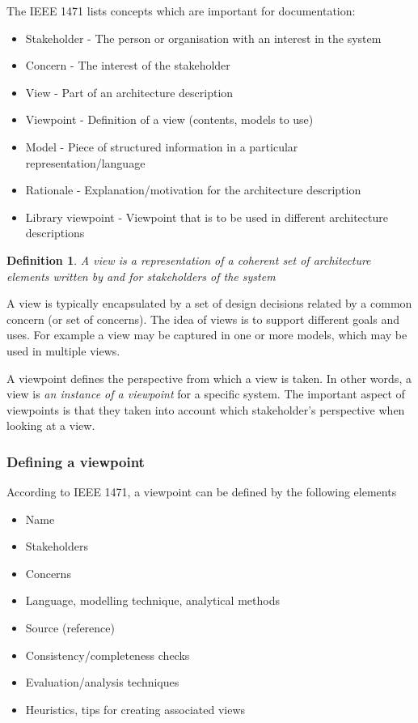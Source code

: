 \documentclass{sty/SizheArticle}
\newtheorem{definition}{Definition}
\begin{document}
The IEEE 1471 lists concepts which are important for documentation:
\begin{itemize}
\item Stakeholder - The person or organisation with an interest
  in the system
\item Concern - The interest of the stakeholder
\item View - Part of an architecture description
\item Viewpoint - Definition of a view (contents, models to use)
\item Model - Piece of structured information in a particular
  representation/language
\item Rationale - Explanation/motivation for the architecture description
\item Library viewpoint - Viewpoint that is to be used in
  different architecture descriptions
\end{itemize}

\begin{definition}
  A view is a representation of a coherent set of architecture
  elements written by and for stakeholders of the system
\end{definition}
A view is typically encapsulated by a set of design decisions
related by a common concern (or set of concerns). The idea of views
is to support different goals and uses. For example a view may be
captured in one or more models, which may be used in multiple views.

A viewpoint defines the perspective from which a view is taken.
In other words, a view is \textit{an instance of a viewpoint}
for a specific system. The important aspect of viewpoints is
that they taken into account which stakeholder's perspective when
looking at a view.
\subsubsection{Defining a viewpoint}
According to IEEE 1471, a viewpoint can be defined by the following
elements
\begin{itemize}
\item Name
\item Stakeholders
\item Concerns
\item Language, modelling technique, analytical methods
\item Source (reference)
\item Consistency/completeness checks
\item Evaluation/analysis techniques
\item Heuristics, tips for creating associated views
\end{itemize}
\end{document}
